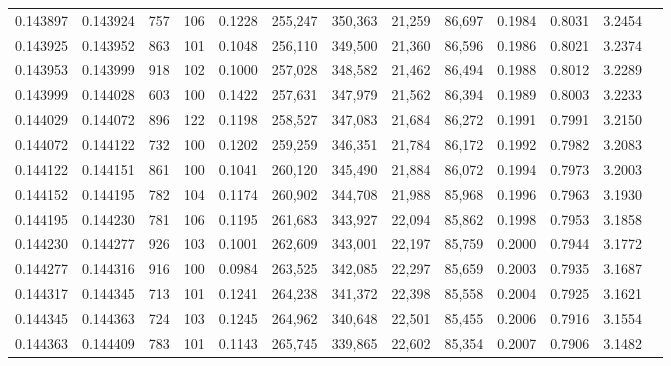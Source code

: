 \begin{tabular}{rrrrrrrrrrrrr}
0.143897 & 0.143924 &   757 & 106 &                                     0.1228 & 255,247 & 350,363 &  21,259 &  86,697 & 0.1984 & 0.8031 & 3.2454 \\
0.143925 & 0.143952 &   863 & 101 &                                     0.1048 & 256,110 & 349,500 &  21,360 &  86,596 & 0.1986 & 0.8021 & 3.2374 \\
0.143953 & 0.143999 &   918 & 102 &                                     0.1000 & 257,028 & 348,582 &  21,462 &  86,494 & 0.1988 & 0.8012 & 3.2289 \\
0.143999 & 0.144028 &   603 & 100 &                                     0.1422 & 257,631 & 347,979 &  21,562 &  86,394 & 0.1989 & 0.8003 & 3.2233 \\
0.144029 & 0.144072 &   896 & 122 &                                     0.1198 & 258,527 & 347,083 &  21,684 &  86,272 & 0.1991 & 0.7991 & 3.2150 \\
0.144072 & 0.144122 &   732 & 100 &                                     0.1202 & 259,259 & 346,351 &  21,784 &  86,172 & 0.1992 & 0.7982 & 3.2083 \\
0.144122 & 0.144151 &   861 & 100 &                                     0.1041 & 260,120 & 345,490 &  21,884 &  86,072 & 0.1994 & 0.7973 & 3.2003 \\
0.144152 & 0.144195 &   782 & 104 &                                     0.1174 & 260,902 & 344,708 &  21,988 &  85,968 & 0.1996 & 0.7963 & 3.1930 \\
0.144195 & 0.144230 &   781 & 106 &                                     0.1195 & 261,683 & 343,927 &  22,094 &  85,862 & 0.1998 & 0.7953 & 3.1858 \\
0.144230 & 0.144277 &   926 & 103 &                                     0.1001 & 262,609 & 343,001 &  22,197 &  85,759 & 0.2000 & 0.7944 & 3.1772 \\
0.144277 & 0.144316 &   916 & 100 &                                     0.0984 & 263,525 & 342,085 &  22,297 &  85,659 & 0.2003 & 0.7935 & 3.1687 \\
0.144317 & 0.144345 &   713 & 101 &                                     0.1241 & 264,238 & 341,372 &  22,398 &  85,558 & 0.2004 & 0.7925 & 3.1621 \\
0.144345 & 0.144363 &   724 & 103 &                                     0.1245 & 264,962 & 340,648 &  22,501 &  85,455 & 0.2006 & 0.7916 & 3.1554 \\
0.144363 & 0.144409 &   783 & 101 &                                     0.1143 & 265,745 & 339,865 &  22,602 &  85,354 & 0.2007 & 0.7906 & 3.1482 \\

\end{tabular}

